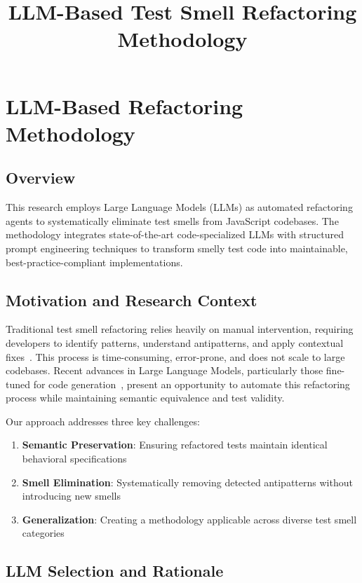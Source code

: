 \documentclass[12pt]{article}
\title{LLM-Based Test Smell Refactoring Methodology}
\author{}
\date{}
\begin{document}
\maketitle

\section{LLM-Based Refactoring Methodology}
\label{sec:llm-methodology}

\subsection{Overview}

This research employs Large Language Models (LLMs) as automated refactoring agents to systematically eliminate test smells from JavaScript codebases. The methodology integrates state-of-the-art code-specialized LLMs with structured prompt engineering techniques to transform smelly test code into maintainable, best-practice-compliant implementations.

\subsection{Motivation and Research Context}

Traditional test smell refactoring relies heavily on manual intervention, requiring developers to identify patterns, understand antipatterns, and apply contextual fixes~\cite{mockus2022test}. This process is time-consuming, error-prone, and does not scale to large codebases. Recent advances in Large Language Models, particularly those fine-tuned for code generation~\cite{brown2020language, chen2021evaluating}, present an opportunity to automate this refactoring process while maintaining semantic equivalence and test validity.

Our approach addresses three key challenges:
\begin{enumerate}
    \item \textbf{Semantic Preservation}: Ensuring refactored tests maintain identical behavioral specifications
    \item \textbf{Smell Elimination}: Systematically removing detected antipatterns without introducing new smells
    \item \textbf{Generalization}: Creating a methodology applicable across diverse test smell categories
\end{enumerate}

\subsection{LLM Selection and Rationale}
\end{document}
